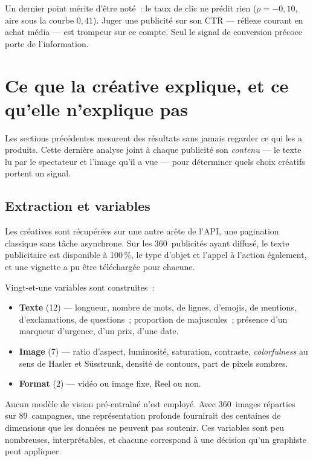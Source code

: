 \documentclass[11pt,a4paper]{article}
\begin{document}
Un dernier point mérite d'être noté~: le taux de clic ne prédit rien
($\rho = -0{,}10$, aire sous la courbe $0{,}41$). Juger une publicité sur son
CTR --- réflexe courant en achat média --- est trompeur sur ce compte. Seul le
signal de conversion précoce porte de l'information.

\section{Ce que la créative explique, et ce qu'elle n'explique pas}

Les sections précédentes mesurent des résultats sans jamais regarder ce qui les
a produits. Cette dernière analyse joint à chaque publicité son \emph{contenu}
--- le texte lu par le spectateur et l'image qu'il a vue --- pour déterminer
quels choix créatifs portent un signal.

\subsection{Extraction et variables}

Les créatives sont récupérées sur une autre arête de l'API, une pagination
classique sans tâche asynchrone. Sur les 360~publicités ayant diffusé, le texte
publicitaire est disponible à 100\,\%, le type d'objet et l'appel à l'action
également, et une vignette a pu être téléchargée pour chacune.

Vingt-et-une variables sont construites~:

\begin{itemize}
  \item \textbf{Texte} (12) --- longueur, nombre de mots, de lignes, d'emojis,
        de mentions, d'exclamations, de questions~; proportion de majuscules~;
        présence d'un marqueur d'urgence, d'un prix, d'une date.
  \item \textbf{Image} (7) --- ratio d'aspect, luminosité, saturation,
        contraste, \emph{colorfulness} au sens de Hasler et Süsstrunk, densité
        de contours, part de pixels sombres.
  \item \textbf{Format} (2) --- vidéo ou image fixe, Reel ou non.
\end{itemize}

Aucun modèle de vision pré-entraîné n'est employé. Avec 360~images réparties
sur 89~campagnes, une représentation profonde fournirait des centaines de
dimensions que les données ne peuvent pas soutenir. Ces variables sont peu
nombreuses, interprétables, et chacune correspond à une décision qu'un
graphiste peut appliquer.
\end{document}
